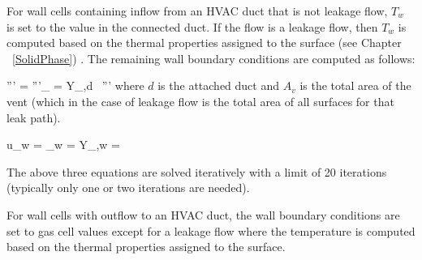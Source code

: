 For wall cells containing inflow from an HVAC duct that is not leakage flow, $T_w$ is set to the value in the connected duct.  If the flow is a leakage flow, then $T_w$ is computed based on the thermal properties assigned to the surface (see Chapter ~\ref{SolidPhase}) .  The remaining wall boundary conditions are computed as follows:

\be {}''' =  \ee
\be {}'''_{\alpha} = Y_{\alpha,d} \, ''' \ee
where $d$ is the attached duct and $A_v$ is the total area of the vent (which in the case of leakage flow is the total area of all surfaces for that leak path).

\be u_w =  \ee
\be \rho_w =  \ee
\be Y_{\alpha,w} =  \ee

The above three equations are solved iteratively with a limit of 20 iterations (typically only one or two iterations are needed).

For wall cells with outflow to an HVAC duct, the wall boundary conditions are set to gas cell values except for a leakage flow where the temperature is computed based on the thermal properties assigned to the surface.
